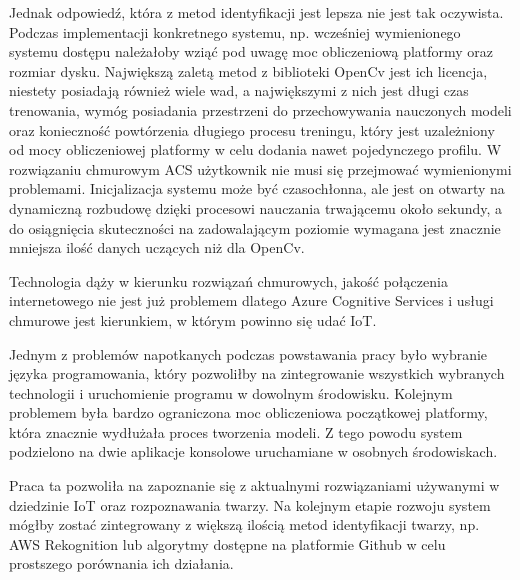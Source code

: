 Jednak odpowiedź, która z metod identyfikacji jest lepsza nie jest tak oczywista. Podczas implementacji konkretnego systemu, np. wcześniej wymienionego systemu dostępu należałoby wziąć pod uwagę moc obliczeniową platformy oraz rozmiar dysku. Największą zaletą metod z biblioteki OpenCv jest ich licencja, niestety posiadają również wiele wad, a największymi z nich jest długi czas trenowania, wymóg posiadania przestrzeni do przechowywania nauczonych modeli oraz konieczność powtórzenia długiego procesu treningu, który jest uzależniony od mocy obliczeniowej platformy w celu dodania nawet pojedynczego profilu. W rozwiązaniu chmurowym ACS użytkownik nie musi się przejmować wymienionymi problemami. Inicjalizacja systemu może być czasochłonna, ale jest on otwarty na dynamiczną rozbudowę dzięki procesowi nauczania trwającemu około sekundy, a do osiągnięcia skuteczności na zadowalającym poziomie wymagana jest znacznie mniejsza ilość danych uczących niż dla OpenCv. 

Technologia dąży w kierunku rozwiązań chmurowych, jakość połączenia internetowego nie jest już problemem dlatego Azure Cognitive Services i usługi chmurowe jest kierunkiem, w którym powinno się udać IoT.

Jednym z problemów napotkanych podczas powstawania pracy było wybranie języka programowania, który pozwoliłby na zintegrowanie wszystkich wybranych technologii i uruchomienie programu w dowolnym środowisku. Kolejnym problemem była bardzo ograniczona moc obliczeniowa początkowej platformy, która znacznie wydłużała proces tworzenia modeli. Z tego powodu system podzielono na dwie aplikacje konsolowe uruchamiane w osobnych środowiskach.

Praca ta pozwoliła na zapoznanie się  z aktualnymi rozwiązaniami używanymi w dziedzinie IoT oraz rozpoznawania twarzy. Na kolejnym etapie rozwoju system mógłby zostać zintegrowany z większą ilością metod identyfikacji twarzy, np. AWS Rekognition lub algorytmy dostępne na platformie Github w celu prostszego porównania ich działania.

